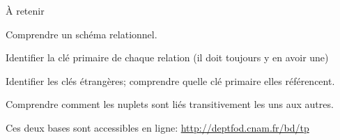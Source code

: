 
\begin{frame}{À retenir}

Comprendre un schéma relationnel.

\vfill
\begin{redbullet}
  \item Identifier la clé primaire de chaque relation (il doit \alert{toujours} y en avoir une)
 \item Identifier les clés étrangères; comprendre quelle clé primaire elles référencent.
 \item Comprendre comment les nuplets sont liés transitivement les uns aux autres.
\end{redbullet}

\vfill

Ces deux bases sont accessibles en ligne: \url{http://deptfod.cnam.fr/bd/tp}
\end{frame}

